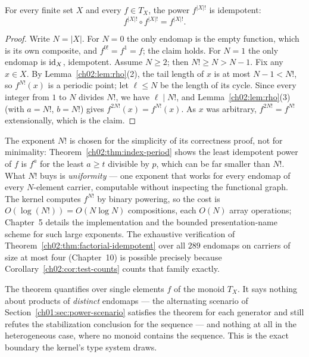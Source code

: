 \begin{theorem}\label{ch02:thm:factorial-idempotent}
For every finite set $X$ and every $f \in T_X$, the power $f^{|X|!}$ is
idempotent:
\[
f^{|X|!} \circ f^{|X|!} = f^{|X|!}.
\]
\end{theorem}

\begin{proof}
Write $N = |X|$. For $N = 0$ the only endomap is the empty function, which
is its own composite, and $f^{0!} = f^1 = f$; the claim holds. For
$N = 1$ the only endomap is $\mathrm{id}_X$, idempotent. Assume $N \geq 2$; then
$N! \geq N > N - 1$. Fix any $x \in X$. By Lemma~\ref{ch02:lem:rho}(2),
the tail length of $x$ is at most $N - 1 < N!$, so $f^{N!}(x)$ is a
periodic point; let $\ell \leq N$ be the length of its cycle. Since every
integer from $1$ to $N$ divides $N!$, we have $\ell \mid N!$, and
Lemma~\ref{ch02:lem:rho}(3) (with $a = N!$, $b = N!$) gives
$f^{2 N!}(x) = f^{N!}(x)$. As $x$ was arbitrary, $f^{2N!} = f^{N!}$
extensionally, which is the claim.
\end{proof}

\begin{remark}\label{ch02:rem:factorial-sharp}
The exponent $N!$ is chosen for the simplicity of its correctness proof,
not for minimality: Theorem~\ref{ch02:thm:index-period} shows the least
idempotent power of $f$ is $f^{a}$ for the least $a \geq t$ divisible by
$p$, which can be far smaller than $N!$. What $N!$ buys is
\emph{uniformity} --- one exponent that works for every endomap of every
$N$-element carrier, computable without inspecting the functional graph.
The kernel computes $f^{N!}$ by binary powering, so the cost is
$O(\log(N!)) = O(N \log N)$ compositions, each $O(N)$ array operations;
Chapter~5 details the implementation and the bounded presentation-name
scheme for such large exponents. The exhaustive verification of
Theorem~\ref{ch02:thm:factorial-idempotent} over all $289$ endomaps on
carriers of size at most four (Chapter~10) is possible precisely because
Corollary~\ref{ch02:cor:test-counts} counts that family exactly.
\end{remark}

\begin{remark}\label{ch02:rem:factorial-scope}
The theorem quantifies over single elements $f$ of the monoid $T_X$. It
says nothing about products of \emph{distinct} endomaps --- the alternating
scenario of Section~\ref{ch01:sec:power-scenario} satisfies the theorem for
each generator and still refutes the stabilization conclusion for the
sequence --- and nothing at all in the heterogeneous case, where no monoid
contains the sequence. This is the exact boundary the kernel's type system
draws.
\end{remark}

